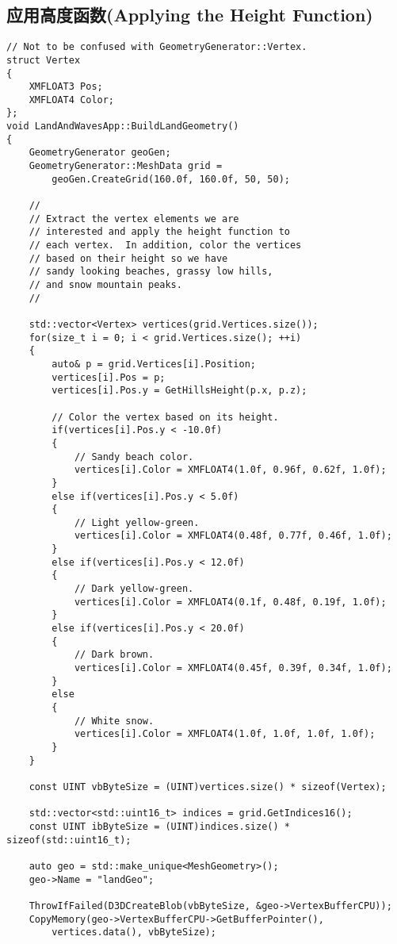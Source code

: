 \subsection{应用高度函数(Applying the Height Function)}
\begin{lstlisting}
// Not to be confused with GeometryGenerator::Vertex.
struct Vertex
{
    XMFLOAT3 Pos;
    XMFLOAT4 Color;
};
void LandAndWavesApp::BuildLandGeometry()
{
    GeometryGenerator geoGen;
    GeometryGenerator::MeshData grid = 
        geoGen.CreateGrid(160.0f, 160.0f, 50, 50);

    //
    // Extract the vertex elements we are 
    // interested and apply the height function to
    // each vertex.  In addition, color the vertices
    // based on their height so we have
    // sandy looking beaches, grassy low hills, 
    // and snow mountain peaks.
    //

    std::vector<Vertex> vertices(grid.Vertices.size());
    for(size_t i = 0; i < grid.Vertices.size(); ++i)
    {
        auto& p = grid.Vertices[i].Position;
        vertices[i].Pos = p;
        vertices[i].Pos.y = GetHillsHeight(p.x, p.z);

        // Color the vertex based on its height.
        if(vertices[i].Pos.y < -10.0f)
        {
            // Sandy beach color.
            vertices[i].Color = XMFLOAT4(1.0f, 0.96f, 0.62f, 1.0f);
        }
        else if(vertices[i].Pos.y < 5.0f)
        {
            // Light yellow-green.
            vertices[i].Color = XMFLOAT4(0.48f, 0.77f, 0.46f, 1.0f);
        }
        else if(vertices[i].Pos.y < 12.0f)
        {
            // Dark yellow-green.
            vertices[i].Color = XMFLOAT4(0.1f, 0.48f, 0.19f, 1.0f);
        }
        else if(vertices[i].Pos.y < 20.0f)
        {
            // Dark brown.
            vertices[i].Color = XMFLOAT4(0.45f, 0.39f, 0.34f, 1.0f);
        }
        else
        {
            // White snow.
            vertices[i].Color = XMFLOAT4(1.0f, 1.0f, 1.0f, 1.0f);
        }
    }
    
    const UINT vbByteSize = (UINT)vertices.size() * sizeof(Vertex);

    std::vector<std::uint16_t> indices = grid.GetIndices16();
    const UINT ibByteSize = (UINT)indices.size() * sizeof(std::uint16_t);

    auto geo = std::make_unique<MeshGeometry>();
    geo->Name = "landGeo";

    ThrowIfFailed(D3DCreateBlob(vbByteSize, &geo->VertexBufferCPU));
    CopyMemory(geo->VertexBufferCPU->GetBufferPointer(), 
        vertices.data(), vbByteSize);


\end{lstlisting}
